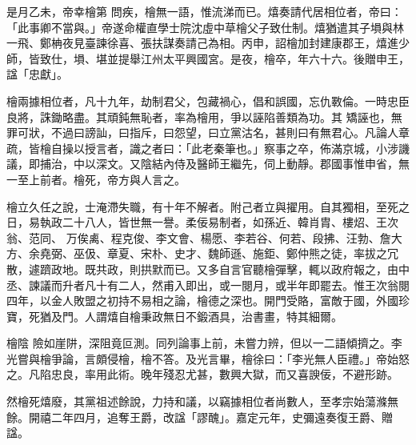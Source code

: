 \begin{pinyinscope}
 是月乙未，帝幸檜第
 問疾，檜無一語，惟流涕而已。熺奏請代居相位者，帝曰：「此事卿不當與。」帝遂命權直學士院沈虛中草檜父子致仕制。熺猶遣其子塤與林一飛、鄭柟夜見臺諫徐喜、張扶謀奏請己為相。丙申，詔檜加封建康郡王，熺進少師，皆致仕，塤、堪並提舉江州太平興國宮。是夜，檜卒，年六十六。後贈申王，諡「忠獻」。



 檜兩據相位者，凡十九年，劫制君父，包藏禍心，倡和誤國，忘仇斁倫。一時忠臣良將，誅鋤略盡。其頑鈍無恥者，率為檜用，爭以誣陷善類為功。其
 矯誣也，無罪可狀，不過曰謗訕，曰指斥，曰怨望，曰立黨沽名，甚則曰有無君心。凡論人章疏，皆檜自操以授言者，識之者曰：「此老秦筆也。」察事之卒，佈滿京城，小涉譏議，即捕治，中以深文。又陰結內侍及醫師王繼先，伺上動靜。郡國事惟申省，無一至上前者。檜死，帝方與人言之。



 檜立久任之說，士淹滯失職，有十年不解者。附己者立與擢用。自其獨相，至死之日，易執政二十八人，皆世無一譽。柔佞易制者，如孫近、韓肖胄、樓炤、王次翁、范同、
 万俟禼、程克俊、李文會、楊愿、李若谷、何若、段拂、汪勃、詹大方、余堯弼、巫伋、章夏、宋朴、史才、魏師遜、施鉅、鄭仲熊之徒，率拔之冗散，遽躋政地。既共政，則拱默而已。又多自言官聽檜彈擊，輒以政府報之，由中丞、諫議而升者凡十有二人，然甫入即出，或一閱月，或半年即罷去。惟王次翁閱四年，以金人敗盟之初持不易相之論，檜德之深也。開門受賂，富敵于國，外國珍寶，死猶及門。人謂熺自檜秉政無日不鍛酒具，治書畫，特其細爾。



 檜陰
 險如崖阱，深阻竟叵測。同列論事上前，未嘗力辨，但以一二語傾擠之。李光嘗與檜爭論，言頗侵檜，檜不答。及光言畢，檜徐曰：「李光無人臣禮。」帝始怒之。凡陷忠良，率用此術。晚年殘忍尤甚，數興大獄，而又喜諛佞，不避形跡。



 然檜死熺廢，其黨祖述餘說，力持和議，以竊據相位者尚數人，至孝宗始蕩滌無餘。開禧二年四月，追奪王爵，改諡「謬醜」。嘉定元年，史彌遠奏復王爵、贈諡。



\end{pinyinscope}
